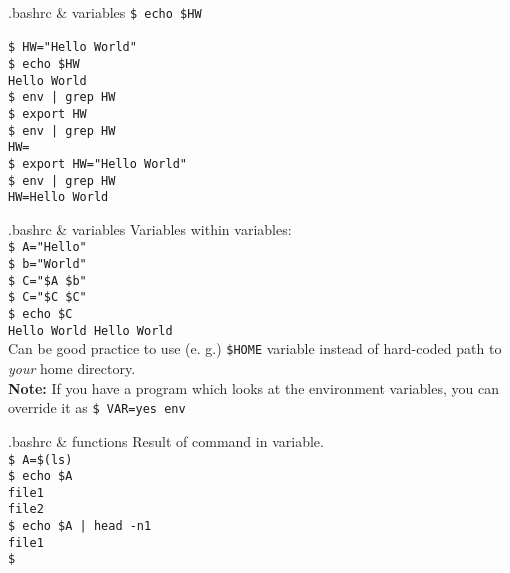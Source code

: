 \documentclass{beamer}
\let\tt\texttt
\let\bf\textbf
\let\it\itshape
\begin{document}
\begin{frame}{.bashrc \& variables}
        \tt{\$ echo \$HW }          \\
        \tt{ }                      \\
        \tt{\$ HW="Hello World" }   \\
        \tt{\$ echo \$HW }          \\
        \tt{Hello World}            \\
        \tt{\$ env | grep HW}       \\
        \tt{\$ export HW}           \\
        \tt{\$ env | grep HW}       \\
        \tt{HW=}                    \\
        \tt{\$ export HW="Hello World"} \\
        \tt{\$ env | grep HW}       \\
        \tt{HW=Hello World}         \\
\end{frame}

\begin{frame}{.bashrc \& variables}
        Variables within variables: \\
        \tt{\$ A="Hello"} \\
        \tt{\$ b="World"} \\
        \tt{\$ C="\$A \$b"} \\
        \tt{\$ C="\$C \$C"} \\
        \tt{\$ echo \$C} \\
        \tt{Hello World Hello World} \\
        Can be good practice to use (e. g.) \tt{\$HOME} variable instead of hard-coded path to {\it your} home directory. \\
        \bf{Note:} If you have a program which looks at the environment variables, you can override it as \tt{\$ VAR=yes env}
\end{frame}

\begin{frame}{.bashrc \& functions}
        Result of command in variable.  \\
        \tt{\$ A=\$(ls) }               \\
        \tt{\$ echo \$A }               \\
        \tt{file1}                      \\
        \tt{file2}                      \\
        \tt{\$ echo \$A | head -n1 }    \\
        \tt{file1}                      \\
        \tt{\$}
\end{frame}
\end{document}
